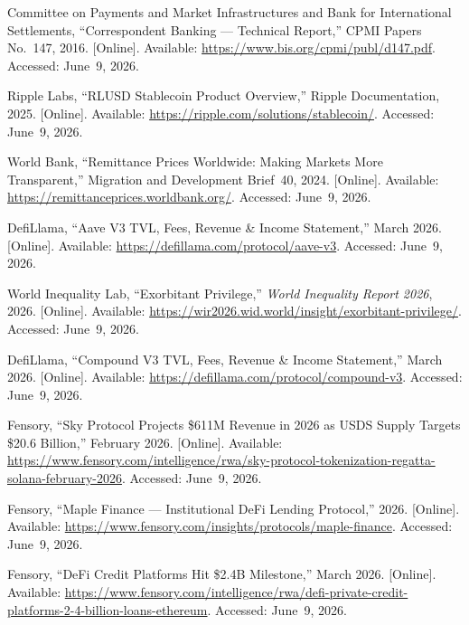 \documentclass[12pt, a4paper]{report}
\begin{document}
{\begin{enumerate}[label={[\arabic*]}]
\item Committee on Payments and Market Infrastructures and Bank for International Settlements, ``Correspondent Banking --- Technical Report,'' CPMI Papers No.~147, 2016. [Online]. Available: \url{https://www.bis.org/cpmi/publ/d147.pdf}. Accessed: June~9, 2026.

\item Ripple Labs, ``RLUSD Stablecoin Product Overview,'' Ripple Documentation, 2025. [Online]. Available: \url{https://ripple.com/solutions/stablecoin/}. Accessed: June~9, 2026.

\item World Bank, ``Remittance Prices Worldwide: Making Markets More Transparent,'' Migration and Development Brief~40, 2024. [Online]. Available: \url{https://remittanceprices.worldbank.org/}. Accessed: June~9, 2026.

\item DefiLlama, ``Aave V3 TVL, Fees, Revenue \& Income Statement,'' March 2026. [Online]. Available: \url{https://defillama.com/protocol/aave-v3}. Accessed: June~9, 2026.

\item World Inequality Lab, ``Exorbitant Privilege,'' \textit{World Inequality Report 2026}, 2026. [Online]. Available: \url{https://wir2026.wid.world/insight/exorbitant-privilege/}. Accessed: June~9, 2026.

\item DefiLlama, ``Compound V3 TVL, Fees, Revenue \& Income Statement,'' March 2026. [Online]. Available: \url{https://defillama.com/protocol/compound-v3}. Accessed: June~9, 2026.

\item Fensory, ``Sky Protocol Projects \$611M Revenue in 2026 as USDS Supply Targets \$20.6 Billion,'' February 2026. [Online]. Available: \url{https://www.fensory.com/intelligence/rwa/sky-protocol-tokenization-regatta-solana-february-2026}. Accessed: June~9, 2026.

\item Fensory, ``Maple Finance --- Institutional DeFi Lending Protocol,'' 2026. [Online]. Available: \url{https://www.fensory.com/insights/protocols/maple-finance}. Accessed: June~9, 2026.

\item Fensory, ``DeFi Credit Platforms Hit \$2.4B Milestone,'' March 2026. [Online]. Available: \url{https://www.fensory.com/intelligence/rwa/defi-private-credit-platforms-2-4-billion-loans-ethereum}. Accessed: June~9, 2026.


\end{enumerate}}
\end{document}
